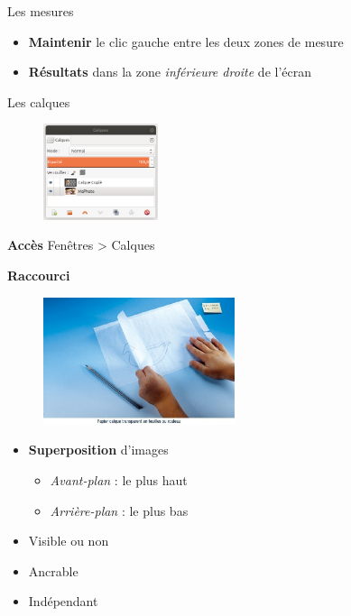 \documentclass[10pt,svgnames,usenames,table]{beamer}
\begin{document}
\begin{frame}[allowframebreaks]{Les mesures}
\begin{itemize}
	\begin{itemize}
		\item \textbf{Maintenir} le clic gauche entre les deux zones de mesure
		\item \textbf{Résultats} dans la zone \textit{inférieure droite} de l'écran
	\end{itemize}
\end{itemize}
\end{frame}

\begin{frame}[allowframebreaks]{Les calques}
	\begin{figure}
	    	\centering
	    	\includegraphics[width=0.3\textwidth]{Images/gimp_calques}
		\end{figure}
	
	\textbf{Accès} Fenêtres > Calques

	\vspace{0.2cm}
	\textbf{Raccourci} 

	\framebreak

	\begin{figure}
	    	\centering
	    	\includegraphics[width=0.5\textwidth]{Images/Calque.jpg}
		\end{figure}

	\begin{itemize}
		\item \textbf{Superposition} d'images
		\begin{itemize}
			\item \textit{Avant-plan} : le plus haut
			\item \textit{Arrière-plan} : le plus bas
		\end{itemize}
		\item Visible ou non 
		\item Ancrable
		\item Indépendant
	\end{itemize}


\end{frame}
\end{document}
